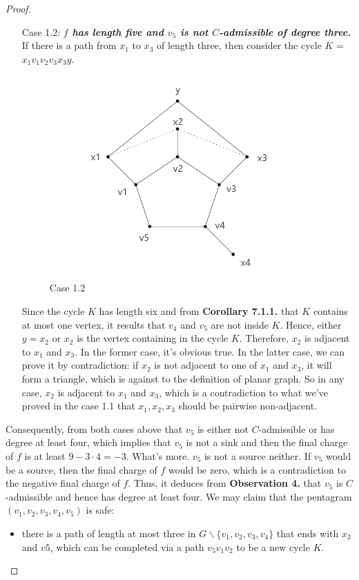 \begin{proof}
\begin{itemize}
    \item[Case 1.2: ] \textit{\textbf{$f$ has length five and $v_5$ is not $C$-admissible of degree three.}} If there is a path from $x_1$ to $x_3$ of length three, then consider the cycle $K$ = $x_1v_1v_2v_3x_3y$. 
    \begin{figure}[H] %
        \centering %
        \includegraphics[width=0.6 \textwidth]{figure/contradictionpentagram.png} 
        \caption{Case 1.2} %
        \label{figure} %
    \end{figure}
    Since the cycle $K$ has length six and from \textbf{Corollary 7.1.1.} that $K$ contains at most one vertex, it results that $v_4$ and $v_5$ are not inside $K$. Hence, either $y = x_2$ or $x_2$ is the vertex containing in the cycle $K$. Therefore, $x_2$ is adjacent to $x_1$ and $x_3$. In the former case, it's obvious true. In the latter case, we can prove it by contradiction: if $x_2$ is not adjacent to one of $x_1$ and $x_3$, it will form a triangle, which is against to the definition of planar graph. So in any case, $x_2$ is adjacent to $x_1$ and $x_3$, which is a contradiction to what we've proved in the case 1.1 that $x_1, x_2, x_3$ should be pairwise non-adjacent. 
\end{itemize}
Consequently, from both cases above that $v_5$ is either not $C$-admissible or has degree at least four, which implies that $v_5$ is not a sink and then the final charge of $f$ is at least $9 - 3 \cdot 4 = -3$. What's more. $v_5$ is not a source neither. If $v_5$ would be a source, then the final charge of $f$ would be zero, which is a contradiction to the negative final charge of $f$. Thus, it deduces from \textbf{Observation 4.} that $v_5$ is $C$-admissible and hence has degree at least four. We may claim that the pentagram $(v_1, v_2, v_3, v_4, v_5)$ is safe: 
\begin{itemize}
    \item there is a path of length at most three in $G \backslash \{v_1, v_2, v_3, v_4\}$ that ends with $x_2$ and $v5$, which can be completed via a path $v_5v_1v_2$ to be a new cycle $K$.

\end{itemize}
\end{proof}
